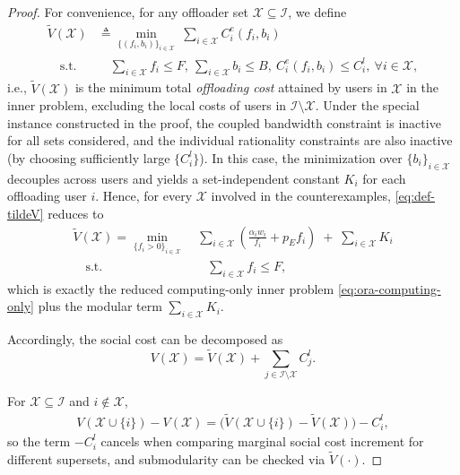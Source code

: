 \documentclass[lettersize,journal]{IEEEtran}
\begin{document}
\begin{proof}
For convenience, for any offloader set $\mathcal{X}\subseteq\mathcal{I}$, we define
\begin{align}
\widetilde V(\mathcal{X})
&\triangleq
\min_{\{(f_i,b_i)\}_{i\in\mathcal{X}}}
\ \sum_{i\in\mathcal{X}} C_i^{e}(f_i,b_i)\label{eq:def-tildeV}\\
\quad
\text{s.t.}&\quad
\sum_{i\in\mathcal{X}} f_i \le F,\ 
\sum_{i\in\mathcal{X}} b_i \le B,\ 
C_i^{e}(f_i,b_i)\le C_i^l,\ \forall i\in\mathcal{X},\nonumber
\end{align}
i.e., $\widetilde V(\mathcal{X})$ is the minimum total \emph{offloading cost} attained by users in $\mathcal{X}$ in the inner problem, excluding the local costs of users in $\mathcal{I}\setminus\mathcal{X}$.
Under the special instance constructed in the proof, the coupled bandwidth constraint is inactive for all sets considered, and the individual rationality constraints are also inactive (by choosing sufficiently large $\{C_i^l\}$). In this case, the minimization over $\{b_i\}_{i\in\mathcal{X}}$ decouples across users and yields a set-independent constant $K_i$ for each offloading user $i$. Hence, for every $\mathcal{X}$ involved in the counterexamples, \eqref{eq:def-tildeV} reduces to
\begin{align}\label{eq:def-tildeV-reduced}
\widetilde V(\mathcal{X})
=
\min_{\{f_i>0\}_{i\in\mathcal{X}}}&
\ \sum_{i\in\mathcal{X}}
\left(\frac{\alpha_i w_i}{f_i}+p_E f_i\right)
\;+\;
\sum_{i\in\mathcal{X}} K_i\\
\quad
\text{s.t.}&\quad
\sum_{i\in\mathcal{X}} f_i \le F,\nonumber
\end{align}
which is exactly the reduced computing-only inner problem \eqref{eq:ora-computing-only} plus the modular term $\sum_{i\in\mathcal{X}}K_i$.

Accordingly, the social cost can be decomposed as
\begin{equation}
V(\mathcal{X})
=
\widetilde V(\mathcal{X})
+
\sum_{j\in\mathcal{I}\setminus\mathcal{X}} C_j^l.
\label{eq:V-decompose}
\end{equation}

For $\mathcal{X}\subseteq\mathcal{I}$ and $i\notin\mathcal{X}$,
\begin{align}
V(\mathcal{X}\cup\{i\})-V(\mathcal{X})
=
\big(\widetilde V(\mathcal{X}\cup\{i\})-\widetilde V(\mathcal{X})\big)
-
C_i^l,
\label{eq:marginal-cancel}
\end{align}
so the term $-C_i^l$ cancels when comparing marginal social cost increment for different supersets, and submodularity can be checked via $\widetilde V(\cdot)$.


\end{proof}
\end{document}
